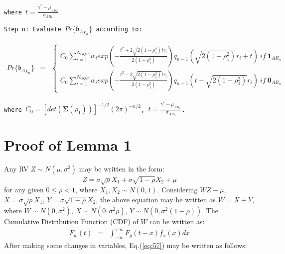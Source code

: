 \documentclass[12pt,draftcls, onecolumn]{IEEEtran}
\begin{document}
\begin{flushleft}
\texttt{where  $t = \frac{\gamma^*-\mu_{AR_k}}{\sigma_{AR_k}}$}
\end{flushleft}

\begin{flushleft}
\texttt{Step n: Evaluate $Pr\{\mathfrak{b}_{A\chi_n}\}$ according to:}
\end{flushleft}

\begingroup
\footnotesize
\begin{eqnarray}
Pr\{\mathfrak{b}_{A\chi_n}\} & = & \left\{
\begin{array}{c}
C_0\sum^{N_{GQR}}_{i=1}w_iexp\left(-\frac{t^2 + 2\sqrt{2\left(1-\rho_1^2\right)}tr_i}{2\left(1-\rho_1^2\right)}\right)q_{n-1}\left(\sqrt{2\left(1-\rho_1^2\right)}r_i+t\right)\ if\ \boldsymbol{1}_{AR_n}\\
C_0\sum^{N_{GQR}}_{i=1}w_iexp\left(-\frac{t^2 - 2\sqrt{2\left(1-\rho_1^2\right)}tr_i}{2\left(1-\rho_1^2\right)}\right)q_{n-1}\left(t-\sqrt{2\left(1-\rho_1^2\right)}r_i\right)\ if\ \boldsymbol{0}_{AR_n}
\end{array}\right.
\end{eqnarray}
\endgroup

\begin{flushleft}
\texttt{where $C_0 = [det\left(\mathbf{\Sigma}\left(\rho_1\right)\right)]^{-1/2}\left(2\pi\right)^{-n/2}$, $t = \frac{\gamma^*-\mu_{AR_n}}{\sigma_{AR_n}}$.}
\end{flushleft}

\section{Proof of Lemma 1}
\label{a2}

Any RV $Z\sim N(\mu,\sigma^2)$ may be written in the form:
\vspace{-1pt}
\begingroup
\begin{equation}
Z=  \sigma \sqrt{\rho} X_1 + \sigma \sqrt{1-\rho} X_2 + \mu
\end{equation}
\endgroup
for any given $0\leq \rho< 1$, where $X_1,X_2\sim N(0,1)$. Considering $W Z-\mu$, $ X =\sigma \sqrt{\rho} X_1$, $Y=\sigma \sqrt{1-\rho} X_2$, the above equation may be written as $W=X+Y$,
\noindent where $W\sim N\left(0,\sigma^2\right)$, $X\sim N \left(0,\sigma^2\rho \right)$, $Y \sim N\left(0,\sigma^2 \left(1-\rho\right)\right)$.
The Cumulative Distribution Function (CDF) of $W$ can be written as:
\vspace{-1pt}
\begingroup
\begin{eqnarray}
F_w(t) &=& \int^{+\infty}_{-\infty}F_y\left(t-x\right)f_x(x) dx \label{eq:57}
\end{eqnarray}
\endgroup
After making some changes in variables, Eq.(\ref{eq:57}) may be written as follows:
\vspace{-1em}
\end{document}
